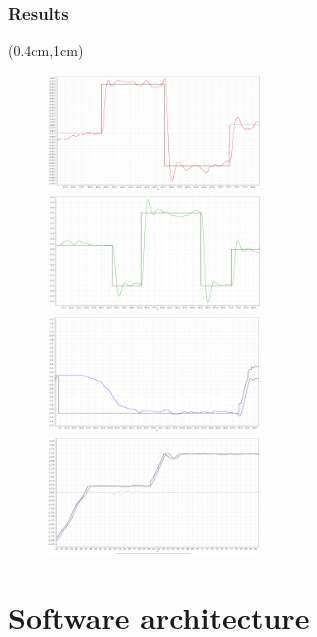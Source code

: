 \documentclass[xcolor=dvipsnames]{beamer}
\begin{document}
\begin{frame}
\frametitle{Results}
\begin{textblock*}{1\textwidth}(0.4cm,1cm)
	\begin{figure}
	\vspace{1em}
	\includegraphics[width = 0.5\textwidth]{f/x_conv.png}
	\includegraphics[width = 0.5\textwidth]{f/y_conv.png} \\
	\vspace{1ex}
	\includegraphics[width = 0.5\textwidth]{f/z_conv.png}
	\includegraphics[width = 0.5\textwidth]{f/yaw_conv.png}
	\end{figure}
\end{textblock*}
\end{frame}


\section{Software architecture}
\end{document}

